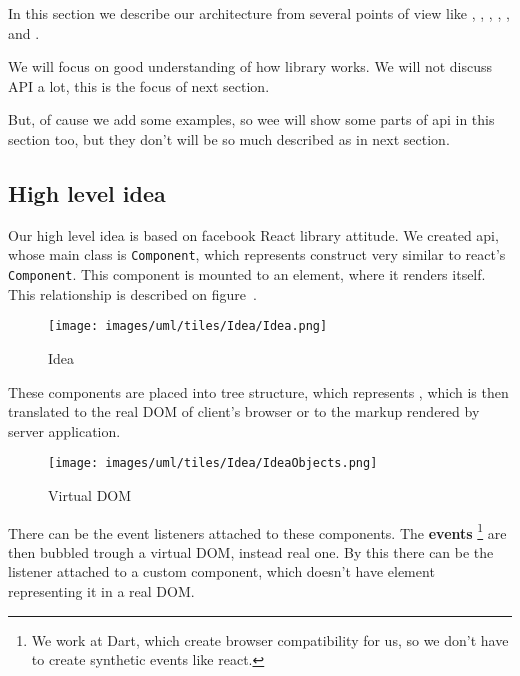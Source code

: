 \documentclass[oneside, 12pt]{book}
\begin{document}
  In this section we describe our architecture from several points of view like , 
  , 
  , 
  , 
  , 
   and
  .

  We will focus on good understanding of how library works. 
  We will not discuss API a lot, this is the focus of next section. 

  But, of cause we add some examples, so wee will show some parts of api in this section too, 
  but they don't will be so much described as in next section.

  \subsection{High level idea}\label{subsec:our-architecture-idea}
    Our high level idea is based on facebook React library attitude. 
    We created api, whose main class is \texttt{Component}, which represents construct very similar to react's \texttt{Component}.
    This component is mounted to an element, where it renders itself. 
    This relationship is described on figure~.
    \begin{figure}[h]
    \centering  
      \texttt{[image: images/uml/tiles/Idea/Idea.png]}
      \caption{Idea}
      \label{img:library-idea}
    \end{figure}

    These components are placed into tree structure, which represents \mbox{\textbf{}}, 
    which is then translated to the real DOM of client's browser or to the markup rendered by server application.

    \begin{figure}[h]
    \centering  
      \texttt{[image: images/uml/tiles/Idea/IdeaObjects.png]}
      \caption{Virtual DOM}
      \label{img:library-idea-virtual-dom}
    \end{figure}
    There can be the event listeners attached to these components. 
    The \textbf{events} \footnote{We work at Dart, which create browser compatibility for us, so we don't have to create synthetic events like react.}
    are then bubbled trough a virtual DOM, instead real one.
    By this there can be the listener attached to a custom component, which doesn't have element representing it in a real DOM.
\end{document}
